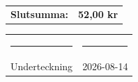 \documentclass[a4paper,11pt]{article}
\begin{document}
\vspace{0.8cm}


\begin{flushright}

\begin{tabular}{lr}
    \textbf{Slutsumma:} & \textbf{52,00 kr}
\end{tabular}

\end{flushright}

\vfill


\begin{center}

\begin{tabular}{p{6cm} p{6cm}}
    \rule{6cm}{0.4pt} &
    \rule{6cm}{0.4pt} \\[0.15cm]
    Underteckning &
    2026-08-14
\end{tabular}

\end{center}
\end{document}
